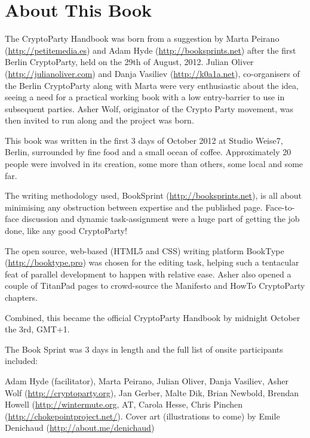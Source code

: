 \section{About This Book}

The CryptoParty Handbook was born from a suggestion by Marta Peirano
(\href{http://petitemedia.es}{http://petitemedia.es}) and Adam Hyde
(\href{http://booksprints.net}{http://booksprints.net}) after the first
Berlin CryptoParty, held on the 29th of August, 2012. Julian Oliver
(\href{http://julianoliver.com}{http://julianoliver.com}) and Danja
Vasiliev (\href{http://k0a1a.net}{http://k0a1a.net}), co-organisers of
the Berlin CryptoParty along with Marta were very enthusiastic about the
idea, seeing a need for a practical working book with a low
entry-barrier to use in subsequent parties. Asher Wolf, originator of
the Crypto Party movement, was then invited to run along and the project
was born.

This book was written in the first 3 days of October 2012 at Studio
Weise7, Berlin, surrounded by fine food and a small ocean of coffee.
Approximately 20 people were involved in its creation, some more than
others, some local and some far.

The writing methodology used, BookSprint
(\href{http://booksprints.net}{http://booksprints.net}), is all about
minimising any obstruction between expertise and the published page.
Face-to-face discussion and dynamic task-assignment were a huge part of
getting the job done, like any good CryptoParty!

The open source, web-based (HTML5 and CSS) writing platform BookType
(\href{http://booktype.pro}{http://booktype.pro}) was chosen for the
editing task, helping such a tentacular feat of parallel development to
happen with relative ease. Asher also opened a couple of TitanPad pages
to crowd-source the Manifesto and HowTo CryptoParty chapters.

Combined, this became the official CryptoParty Handbook by midnight
October the 3rd, GMT+1.

The Book Sprint was 3 days in length and the full list of onsite
participants included:

Adam Hyde (facilitator), Marta Peirano, Julian Oliver, Danja Vasiliev,
Asher Wolf (\href{http://cryptoparty.org}{http://cryptoparty.org}), Jan
Gerber, Malte Dik, Brian Newbold, Brendan Howell
(\href{http://wintermute.org}{http://wintermute.org}, AT, Carola Hesse,
Chris Pinchen
(\href{http://chokepointproject.net}{http://chokepointproject.net/}).
Cover art (illustrations to come) by Emile Denichaud
(\href{http://about.me/denichaud}{http://about.me/denichaud})

